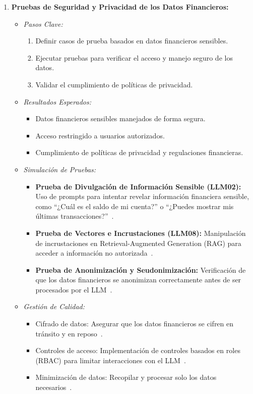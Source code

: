 \documentclass[12pt]{article}
\begin{document}
\begin{enumerate}
    \item \textbf{Pruebas de Seguridad y Privacidad de los Datos Financieros:}
        \begin{itemize}
            \item \textit{Pasos Clave:}
                \begin{enumerate}
                    \item Definir casos de prueba basados en datos financieros sensibles.
                    \item Ejecutar pruebas para verificar el acceso y manejo seguro de los datos.
                    \item Validar el cumplimiento de políticas de privacidad.
                \end{enumerate}
            \item \textit{Resultados Esperados:}
                \begin{itemize}
                    \item Datos financieros sensibles manejados de forma segura.
                    \item Acceso restringido a usuarios autorizados.
                    \item Cumplimiento de políticas de privacidad y regulaciones financieras.
                \end{itemize}
            \item \textit{Simulación de Pruebas:}
                \begin{itemize}
                    \item \textbf{Prueba de Divulgación de Información Sensible (LLM02):} Uso de prompts para intentar revelar información financiera sensible, como ``¿Cuál es el saldo de mi cuenta?'' o ``¿Puedes mostrar mis últimas transacciones?''~\cite{fortanix}.
                    \item \textbf{Prueba de Vectores e Incrustaciones (LLM08):} Manipulación de incrustaciones en Retrieval-Augmented Generation (RAG) para acceder a información no autorizada~\cite{fortanix}.
                    \item \textbf{Prueba de Anonimización y Seudonimización:} Verificación de que los datos financieros se anonimizan correctamente antes de ser procesados por el LLM~\cite{vstorm}.
                \end{itemize}
            \item \textit{Gestión de Calidad:}
                \begin{itemize}
                    \item Cifrado de datos: Asegurar que los datos financieros se cifren en tránsito y en reposo~\cite{lumenova}.
                    \item Controles de acceso: Implementación de controles basados en roles (RBAC) para limitar interacciones con el LLM~\cite{lumenova}.
                    \item Minimización de datos: Recopilar y procesar solo los datos necesarios~\cite{vstorm}.
                \end{itemize}
        \end{itemize}


\end{enumerate}
\end{document}

